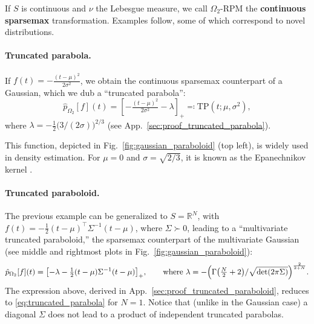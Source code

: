 \documentclass{article}
\newcommand{\remove}[1]{}
\begin{document}
If $S$ is continuous and $\nu$ the Lebesgue measure, we call $\Omega_2$-RPM the {\bf continuous sparsemax} transformation. Examples follow, some of which correspond to  novel distributions.

\paragraph{Truncated parabola.} 
If $f(t) = -\frac{(t-\mu)^2}{2\sigma^2}$, we obtain the continuous sparsemax counterpart of a Gaussian, which we dub a ``truncated parabola'':
\begin{equation}\label{eq:truncated_parabola}
\hat{p}_{\Omega_2}[f](t) 
= \left[ - \tfrac{(t-\mu)^2}{2\sigma^2} - \lambda \right]_+
\eqqcolon \mathrm{TP}(t; \mu, \sigma^2), 
\end{equation}
where $\lambda = -\tfrac{1}{2}\bigl(3/(2\sigma)\bigr)^{2/3}$ (see App.~\ref{sec:proof_truncated_parabola}). 
\remove{
, 
$\mathrm{supp}(\hat{p}_{\Omega_2}[f]) = [\mu - \tfrac{3}{-4\, \lambda}, \mu + \tfrac{3}{-4\, \lambda} ]$ and $\Omega_2(\hat{p}_{\Omega_2}[f]) = -\tfrac{1}{2} - \tfrac{2\lambda}{5}$.
}
This function, depicted in Fig.~\ref{fig:gaussian_paraboloid} (top left), is widely used in density estimation. For $\mu=0$ and $\sigma=\sqrt{2/3}$, it is known as the Epanechnikov kernel \citep{epanechnikov1969non}.


\paragraph{Truncated paraboloid.} 
The previous example can be generalized to $S=\mathbb{R}^N$, with $f(t)=-\frac{1}{2}(t-\mu)^\top\Sigma^{-1}(t-\mu)$, where $\Sigma \succ 0$, leading to a ``multivariate truncated paraboloid,'' the sparsemax counterpart of the multivariate Gaussian (see middle and rightmost plots in Fig.~\ref{fig:gaussian_paraboloid}):
\begin{equation}\label{eq:truncated_paraboloid}
\hat{p}_{\Omega_2}[f](t) = \bigl[-\lambda - \tfrac{1}{2}(t-\mu)\Sigma^{-1}(t-\mu)\bigr]_+, 
\qquad \text{where $\lambda = -\Bigl(\Gamma\bigl(\tfrac{N}{2} + 2\bigr) / \sqrt{\mathrm{det}(2\pi \Sigma)}\Bigr)^{\frac{2}{2+N}}$}.
\end{equation}
The expression above, derived in App.~\ref{sec:proof_truncated_paraboloid}, reduces to \eqref{eq:truncated_parabola} for $N=1$.
Notice that (unlike in the Gaussian case) a diagonal $\Sigma$ does not lead to a product of independent truncated parabolas.
\end{document}
